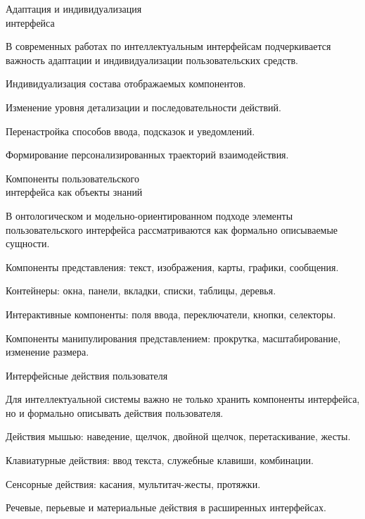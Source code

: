 \begin{frame}{Адаптация и индивидуализация\\ интерфейса}
	\topline
	\justifying

	В современных работах по интеллектуальным интерфейсам подчеркивается важность адаптации и индивидуализации пользовательских средств.
	
	\begin{textitemize}
		\item Индивидуализация состава отображаемых компонентов.
		\item Изменение уровня детализации и последовательности действий.
		\item Перенастройка способов ввода, подсказок и уведомлений.
		\item Формирование персонализированных траекторий взаимодействия.
	\end{textitemize}
\end{frame}

\begin{frame}{Компоненты пользовательского\\ интерфейса как объекты знаний}
	\topline
	\justifying

	В онтологическом и модельно-ориентированном подходе элементы пользовательского интерфейса рассматриваются как формально описываемые сущности.
	
	\begin{textitemize}
		\item Компоненты представления: текст, изображения, карты, графики, сообщения.
		\item Контейнеры: окна, панели, вкладки, списки, таблицы, деревья.
		\item Интерактивные компоненты: поля ввода, переключатели, кнопки, селекторы.
		\item Компоненты манипулирования представлением: прокрутка, масштабирование, изменение размера.
	\end{textitemize}
\end{frame}

\begin{frame}{Интерфейсные действия пользователя}
	\topline
	\justifying

	Для интеллектуальной системы важно не только хранить компоненты интерфейса, но и формально описывать действия пользователя.
	
	\begin{textitemize}
		\item Действия мышью: наведение, щелчок, двойной щелчок, перетаскивание, жесты.
		\item Клавиатурные действия: ввод текста, служебные клавиши, комбинации.
		\item Сенсорные действия: касания, мультитач-жесты, протяжки.
		\item Речевые, перьевые и материальные действия в расширенных интерфейсах.
	\end{textitemize}
\end{frame}

